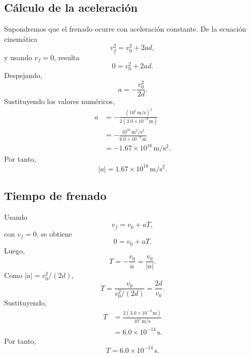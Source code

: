 \documentclass{article}
\numberwithin{equation}{section}
\begin{document}
\subsection{C\'alculo de la aceleraci\'on}

Supondremos que el frenado ocurre con aceleraci\'on constante. De la ecuaci\'on
cinem\'atica
\begin{equation*}
  v_f^2=v_0^2+2ad,
\end{equation*}
y usando $v_f=0$, resulta
\begin{equation*}
  0=v_0^2+2ad.
\end{equation*}
Despejando,
\begin{equation*}
  a=-\frac{v_0^2}{2d}.
\end{equation*}
Sustituyendo los valores num\'ericos,
\begin{align*}
  a
  &=-\frac{(10^5\,\mathrm{m/s})^2}{2(3.0\times10^{-9}\,\mathrm{m})} \\
  &=-\frac{10^{10}\,\mathrm{m^2/s^2}}{6.0\times10^{-9}\,\mathrm{m}} \\
  &=-1.67\times10^{18}\,\mathrm{m/s^2}.
\end{align*}
Por tanto,
\begin{equation}
  \boxed{|a|=1.67\times10^{18}\,\mathrm{m/s^2}.}
  \label{eq:aceleracion_num}
\end{equation}

\subsection{Tiempo de frenado}

Usando
\begin{equation*}
  v_f=v_0+aT,
\end{equation*}
con $v_f=0$, se obtiene
\begin{equation*}
  0=v_0+aT.
\end{equation*}
Luego,
\begin{equation*}
  T=-\frac{v_0}{a}=\frac{v_0}{|a|}.
\end{equation*}
Como $|a|=v_0^2/(2d)$,
\begin{equation*}
  T=\frac{v_0}{v_0^2/(2d)}=\frac{2d}{v_0}.
\end{equation*}
Sustituyendo,
\begin{align*}
  T
  &=\frac{2(3.0\times10^{-9}\,\mathrm{m})}{10^5\,\mathrm{m/s}} \\
  &=6.0\times10^{-14}\,\mathrm{s}.
\end{align*}
Por tanto,
\begin{equation}
  \boxed{T=6.0\times10^{-14}\,\mathrm{s}.}
  \label{eq:tiempo_num}
\end{equation}
\end{document}
